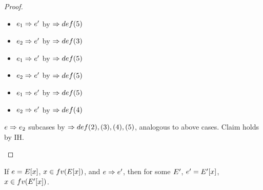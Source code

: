 \documentclass{article}
\begin{document}
\begin{proof}
\begin{byCases}
\begin{byCases}
    \begin{itemize}
      \item $\e_1 \pstep \e'$ by $\pstep def(5)$
      \item $\e_2 \pstep \e'$ by $\pstep def(3)$
    \end{itemize}
  \end{byCases}  
  \renewcommand{\byCasesCaseTemplate}[1]{\textbf{Case {#1}.}}
  \renewcommand{\byCasesCaseTemplate}[1]{\textbf{Subcase {#1}.}}
  \begin{byCases}
    \begin{itemize}
      \item $\e_1 \pstep \e'$ by $\pstep def(5)$
      \item $\e_2 \pstep \e'$ by $\pstep def(5)$
    \end{itemize}
    \begin{itemize}
      \item $\e_1 \pstep \e'$ by $\pstep def(5)$
      \item $\e_2 \pstep \e'$ by $\pstep def(4)$
    \end{itemize}
  \end{byCases}  
  \renewcommand{\byCasesCaseTemplate}[1]{\textbf{Case {#1}.}}
  $\e \pstep \e_2$ subcases by $\pstep def(2),(3),(4),(5)$, 
  analogous to above cases.
  Claim holds by IH.
\end{byCases}
\end{proof}

\begin{lemma}
\label{lem:eclosed}
If $\e = \Ex$, $x \in fv(\Ex)$, and $\e \pstep \e'$, then for some $\E'$, $\e'
= \Ex[']$, $x \in fv(\Ex['])$.
\end{lemma}
\end{document}
